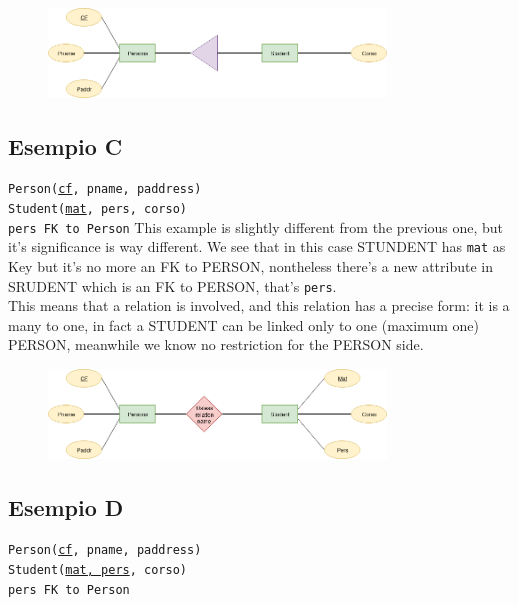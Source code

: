 \documentclass[class=book, crop=false, oneside]{standalone}
\newcommand\tab[1][1cm]{\hspace*{#1}}
\begin{document}
\begin{figure}[H]
	\includegraphics[width=0.8\textwidth,keepaspectratio]{diagram6_01.png}
	\caption{}
	\label{diagram6_01}
\end{figure}

\subsection*{Esempio C}
\texttt{Person(\underline{cf}, pname, paddress)}\\
\texttt{Student(\underline{mat}, pers, corso)}\\
\tab[.4cm] \texttt{pers FK to Person}
\vskip 8pt
This example is slightly different from the previous one, but it's significance is way different. We see that in this case STUNDENT has \texttt{mat} as Key but it's no more an FK to PERSON, nontheless there's a new attribute in SRUDENT which is an FK to PERSON, that's \texttt{pers}.\\
This means that a relation is involved, and this relation has a precise form: it is a many to one, in fact a STUDENT can be linked only to one (maximum one) PERSON, meanwhile we know no restriction for the PERSON side.

\begin{figure}[H]
	\includegraphics[width=0.8\textwidth,keepaspectratio]{diagram6_02.png}
	\caption{}
	\label{diagram6_02}
\end{figure}

\subsection*{Esempio D}
\texttt{Person(\underline{cf}, pname, paddress)}\\
\texttt{Student(\underline{mat, pers}, corso)}\\
\tab[.4cm] \texttt{pers FK to Person}
\vskip 8pt
\end{document}
